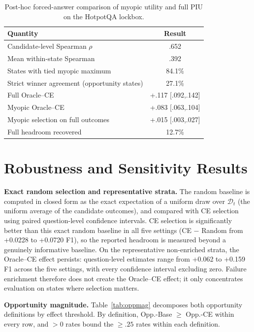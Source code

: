 \documentclass[10pt]{article}
\newcommand{\stitle}[1]{\vspace{0.4em}\noindent\textbf{#1}\hspace{0.6em}}
\begin{document}
\begin{table}[h]
\centering
\small
\caption{Post-hoc forced-answer comparison of myopic utility and full PIU on
the HotpotQA lockbox.}
\label{tab:myopic}
\begin{tabular}{lc}
\toprule
\textbf{Quantity} & \textbf{Result} \\
\midrule
Candidate-level Spearman $\rho$ & .652 \\
Mean within-state Spearman & .392 \\
States with tied myopic maximum & 84.1\% \\
Strict winner agreement (opportunity states) & 27.1\% \\
Full Oracle--CE & +.117 [.092,.142] \\
Myopic Oracle--CE & +.083 [.063,.104] \\
Myopic selection on full outcomes & +.015 [.003,.027] \\
Full headroom recovered & 12.7\% \\
\bottomrule
\end{tabular}
\end{table}

\section{Robustness and Sensitivity Results}
\label{sec:robustness}

\stitle{Exact random selection and representative strata.}
The random baseline is computed in closed form as the exact expectation of a
uniform draw over $\mathcal{D}_t$ (the uniform average of the candidate
outcomes), and compared with CE selection using paired question-level
confidence intervals. CE selection is significantly better than this exact
random baseline in all five settings (CE $-$ Random from +0.0228 to +0.0720
F1), so the reported headroom is measured beyond a genuinely informative
baseline. On the representative non-enriched strata, the Oracle--CE effect
persists: question-level estimates range from +0.062 to +0.159 F1 across the
five settings, with every confidence interval excluding zero. Failure
enrichment therefore does not create the Oracle--CE effect; it only
concentrates evaluation on states where selection matters.

\stitle{Opportunity magnitude.}
Table~\ref{tab:oppmag} decomposes both opportunity definitions by effect
threshold. By definition, Opp.-Base $\ge$ Opp.-CE within every row, and
$>0$ rates bound the $\ge.25$ rates within each definition.
\end{document}
